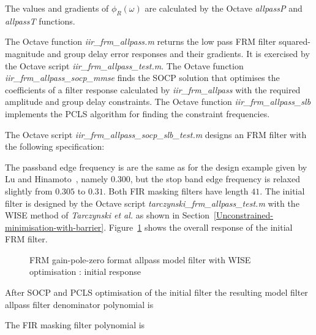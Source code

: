 \documentclass[a4paper,twoside,10pt,english]{report}
\begin{document}
The values and gradients of $\phi_{R}\left(\omega\right)$ are calculated by the
Octave \emph{allpassP} and \emph{allpassT} functions. 

The Octave function
\emph{iir\_frm\_allpass.m} returns the low pass FRM filter squared-magnitude and
group delay error responses and their gradients. It is exercised by the Octave
script \emph{iir\_frm\_allpass\_test.m}. The Octave function
\emph{iir\_frm\_allpass\_socp\_mmse} finds the SOCP solution that optimises 
the coefficients of a filter response calculated by \emph{iir\_frm\_allpass}
with the required amplitude and group delay constraints. The Octave 
function \emph{iir\_frm\_allpass\_slb} implements the PCLS algorithm for 
finding the constraint frequencies.

The Octave script \emph{iir\_frm\_allpass\_socp\_slb\_test.m} designs an FRM
filter with the following specification:
\begin{small}

\end{small}
The passband edge frequency is are the same as for the design example given by 
Lu and Hinamoto~\cite[Section V.E]{LuHinamoto_IIRFrequencyMaskingFiltersConeProgramming},
namely $0.300$, but the stop band edge frequency is relaxed slightly from 
$0.305$ to $0.31$. Both FIR masking filters have length $41$.
The initial filter is designed by the Octave script 
\emph{tarczynski\_frm\_allpass\_test.m} with the WISE method of
\emph{Tarczynski et al.} as shown in 
Section~\ref{Unconstrained-minimisation-with-barrier}. 
Figure~\ref{fig:iir-frm-allpass-initial-response} shows the overall response of 
the initial FRM filter. 
\begin{figure}[!htbp]
\begin{center}
\scalebox{0.7}{}
\caption{FRM gain-pole-zero format allpass model filter with WISE optimisation : initial response}
\label{fig:iir-frm-allpass-initial-response}
\end{center}
\end{figure}
After SOCP and PCLS optimisation of the initial filter the resulting
model filter allpass filter denominator polynomial is
\begin{small}

\end{small}
The FIR masking filter polynomial is
\begin{small}

\end{small}
\end{document}

